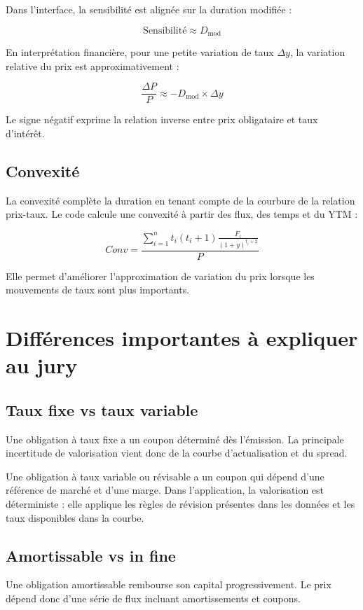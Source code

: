 \documentclass[12pt,a4paper]{article}
\begin{document}
Dans l'interface, la sensibilité est alignée sur la duration modifiée :

\[
\text{Sensibilité} \approx D_{\text{mod}}
\]

En interprétation financière, pour une petite variation de taux $\Delta y$, la variation relative du prix est approximativement :

\[
\frac{\Delta P}{P}
\approx
-D_{\text{mod}} \times \Delta y
\]

Le signe négatif exprime la relation inverse entre prix obligataire et taux d'intérêt.

\subsection{Convexité}

La convexité complète la duration en tenant compte de la courbure de la relation prix-taux. Le code calcule une convexité à partir des flux, des temps et du YTM :

\[
Conv =
\frac{
\sum_{i=1}^{n}
t_i(t_i+1)
\frac{F_i}{(1+y)^{t_i+2}}
}{
P
}
\]

Elle permet d'améliorer l'approximation de variation du prix lorsque les mouvements de taux sont plus importants.

\section{Différences importantes à expliquer au jury}

\subsection{Taux fixe vs taux variable}

Une obligation à taux fixe a un coupon déterminé dès l'émission. La principale incertitude de valorisation vient donc de la courbe d'actualisation et du spread.

Une obligation à taux variable ou révisable a un coupon qui dépend d'une référence de marché et d'une marge. Dans l'application, la valorisation est déterministe : elle applique les règles de révision présentes dans les données et les taux disponibles dans la courbe.

\subsection{Amortissable vs in fine}

Une obligation amortissable rembourse son capital progressivement. Le prix dépend donc d'une série de flux incluant amortissements et coupons.
\end{document}
